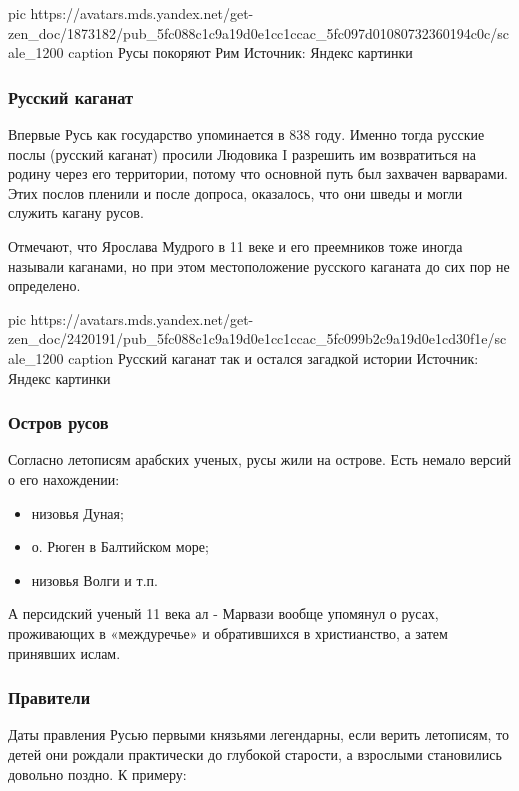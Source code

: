 \ifcmt
pic https://avatars.mds.yandex.net/get-zen_doc/1873182/pub_5fc088c1c9a19d0e1cc1ccac_5fc097d01080732360194c0c/scale_1200
caption Русы покоряют Рим Источник: Яндекс картинки
\fi

\subsubsection{Русский каганат}

Впервые Русь как государство упоминается в 838 году. Именно тогда русские послы
(русский каганат) просили Людовика I разрешить им возвратиться на родину через
его территории, потому что основной путь был захвачен варварами. Этих послов
пленили и после допроса, оказалось, что они шведы и могли служить кагану русов.

Отмечают, что Ярослава Мудрого в 11 веке и его преемников тоже иногда называли
каганами, но при этом местоположение русского каганата до сих пор не
определено.

\ifcmt
pic https://avatars.mds.yandex.net/get-zen_doc/2420191/pub_5fc088c1c9a19d0e1cc1ccac_5fc099b2c9a19d0e1cd30f1e/scale_1200
caption Русский каганат так и остался загадкой истории Источник: Яндекс картинки
\fi

\subsubsection{Остров русов}

Согласно летописям арабских ученых, русы жили на острове. Есть немало версий о
его нахождении:

\begin{itemize}
  \item низовья Дуная;
  \item о. Рюген в Балтийском море;
  \item низовья Волги и т.п.
\end{itemize}

А персидский ученый 11 века ал - Марвази вообще упомянул о русах, проживающих в
«междуречье» и обратившихся в христианство, а затем принявших ислам.

\subsubsection{Правители}

Даты правления Русью первыми князьями легендарны, если верить летописям, то
детей они рождали практически до глубокой старости, а взрослыми становились
довольно поздно. К примеру:

